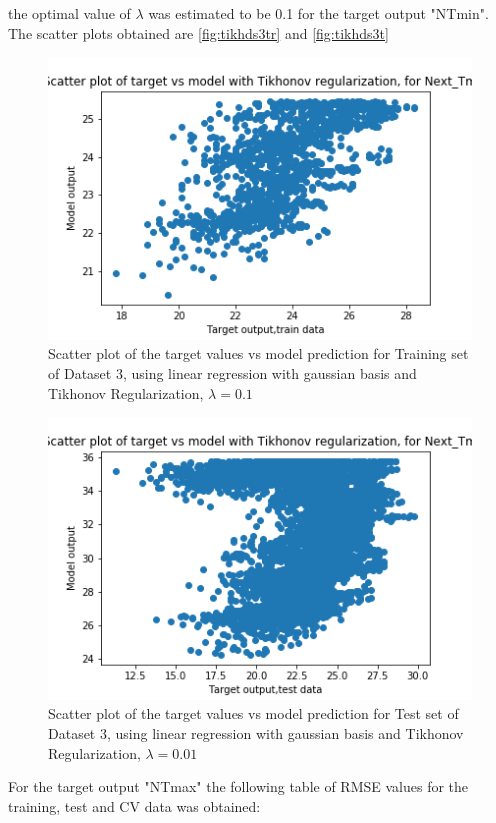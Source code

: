 \documentclass[12pt,a4paper]{article}
\newcommand{\noi}{\noindent}
\begin{document}
\noi
the optimal value of $\lambda$ was estimated to be 0.1 for the target output "NTmin". The scatter plots obtained are \autoref{fig:tikhds3tr} and \autoref{fig:tikhds3t}
\begin{figure}[H]
     \centering
     \includegraphics[scale=0.5]{images/scatter_ds3tikhtrainT_min.png}
     \caption{Scatter plot of the target values vs model prediction for Training set of Dataset 3, using linear regression with gaussian basis and Tikhonov Regularization, $\lambda = 0.1 $}
     \label{fig:tikhds3tr}
\end{figure}
\begin{figure}[H]
     \centering
     \includegraphics[scale=0.5]{images/scatter_ds3tikhtestT_min.png}
     \caption{Scatter plot of the target values vs model prediction for Test set of Dataset 3, using linear regression with gaussian basis and Tikhonov Regularization, $\lambda = 0.01 $}
     \label{fig:tikhds3t}
\end{figure}
 For the target output "NTmax" the following table of RMSE values for the training, test and CV data was obtained:

\end{document}

